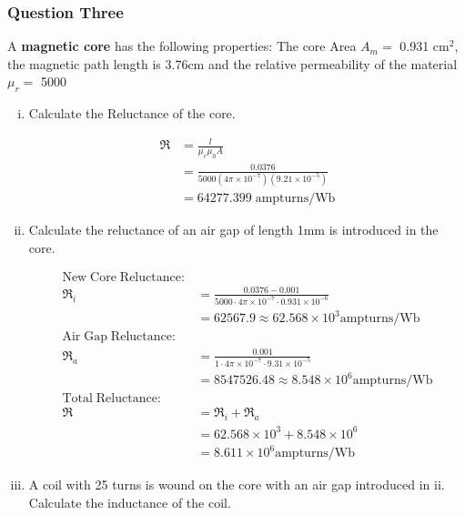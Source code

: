 \documentclass[a4paper,11pt]{article}
\begin{document}
\newpage
\subsubsection*{Question Three}
A \textbf{magnetic core} has the following properties: The core Area $A_m = $ 0.931 cm$^2$, the magnetic path length is 3.76cm and the relative permeability of the material $\mu_r = $ 5000

\begin{enumerate}[i.]
    \item Calculate the Reluctance of the core.

          \begin{align*}
              \mathfrak{R} & = \frac{l}{\mu_{r}\mu_{0}A}                                 \\
                           & = \frac{0.0376}{5000(4\pi\times10^{-7})(9.21\times10^{-5})} \\
                           & = 64277.399 \; \mathrm{ampturns/Wb}
          \end{align*}

    \item Calculate the reluctance of an air gap of length 1mm is introduced in the core.

    \begin{align*}
        \mathrm{New\;Core\;Reluctance:}\\
              \mathfrak{R}_i & = \frac{0.0376 - 0.001}{5000\cdot 4\pi\times10^{-7}\cdot 0.931\times 10^{-6}} \\
                             & = 62567.9 \approx 62.568\times 10^3 \mathrm{ampturns/Wb} \\
          \mathrm{Air\;Gap\;Reluctance:}\\
              \mathfrak{R}_a & = \frac{0.001}{1\cdot 4\pi\times10^{-7}\cdot 9.31\times 10^{-5}} \\
                             & = 8547526.48 \approx 8.548\times 10^6 \mathrm{ampturns/Wb} \\
          \mathrm{Total\;Reluctance:}\\
              \mathfrak{R} & = \mathfrak{R}_i + \mathfrak{R}_a       \\
                           & = 62.568\times 10^3 + 8.548\times 10^6  \\
                           & = 8.611\times 10^6 \mathrm{ampturns/Wb}
          \end{align*}

    \item A coil with 25 turns is wound on the core with an air gap introduced in ii. Calculate the inductance of the coil.


\end{enumerate}
\end{document}
